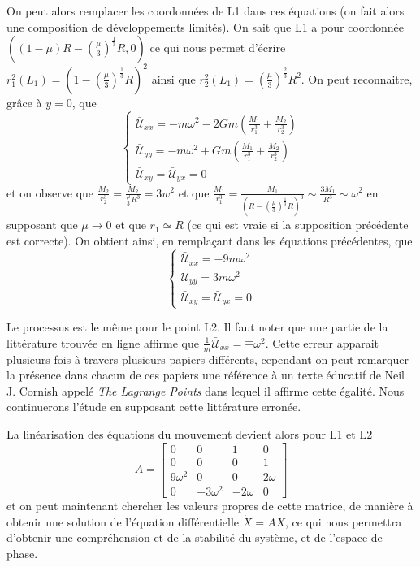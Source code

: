 \documentclass[12pt]{article}
\begin{document}
	On peut alors remplacer les coordonnées de L1 dans ces équations (on fait alors une composition de développements limités). On sait que L1 a pour coordonnée $((1-\mu)R-(\frac{\mu}{3})^\frac{1}{3}R, 0)$ ce qui nous permet d'écrire $r_1^2(L_1) = (1-(\frac{\mu}{3})^\frac{1}{3}R)^2$ ainsi que $r_2^2(L_1) = (\frac{\mu}{3})^\frac{2}{3}R^2$. On peut reconnaitre, grâce à $y=0$, que
	\begin{equation}
		 \begin{cases}
		 	\bar{\mathcal{U}}_{xx} = -m\omega^2 - 2Gm(\frac{M_1}{r_1^3} + \frac{M_2}{r_2^3})
		 	\\
		 	\bar{\mathcal{U}}_{yy} = -m\omega^2 + Gm(\frac{M_1}{r_1^3} + \frac{M_2}{r_2^3})
		 	\\
		 	\bar{\mathcal{U}}_{xy} = \bar{\mathcal{U}}_{yx} = 0
		 \end{cases}
	\end{equation}
	et on observe que $\frac{M_2}{r_2^3} = \frac{M_2}{\frac{\mu}{3}R^3} = 3w^2$ et que $\frac{M_1}{r_1^3} = \frac{M_1}{(R-(\frac{\mu}{3})^\frac{1}{3}R)^3} \sim \frac{3M_1}{R^3} \sim \omega^2$ en supposant que $\mu \to 0$ et que $r_1 \simeq R$ (ce qui est vraie si la supposition précédente est correcte). On obtient ainsi, en remplaçant dans les équations précédentes, que
	\begin{equation}
		\begin{cases}
		 	\bar{\mathcal{U}}_{xx} = -9m\omega^2
			\\
			\bar{\mathcal{U}}_{yy} = 3m\omega^2
			\\
			\bar{\mathcal{U}}_{xy} = \bar{\mathcal{U}}_{yx} = 0
		\end{cases}
	\end{equation}
	
	Le processus est le même pour le point L2. Il faut noter que une partie de la littérature trouvée en ligne affirme que $\frac{1}{m}\bar{\mathcal{U}}_{xx} = \mp \omega^2$. Cette erreur apparait plusieurs fois à travers plusieurs papiers différents, cependant on peut remarquer la présence dans chacun de ces papiers une référence à un texte éducatif de Neil J. Cornish appelé \textit{The Lagrange Points} dans lequel il affirme cette égalité. Nous continuerons l'étude en supposant cette littérature erronée.
	
	La linéarisation des équations du mouvement devient alors pour L1 et L2
	\begin{equation}
		A =
		\begin{bmatrix}
			0 & 0 & 1 & 0 \\
			0 & 0 & 0 & 1 \\
			9\omega^2 & 0
			& 0 & 2\omega \\
			0 & -3\omega^2
			& -2\omega & 0
		\end{bmatrix}
	\end{equation}
	et on peut maintenant chercher les valeurs propres de cette matrice, de manière à obtenir une solution de l'équation différentielle $\dot{X} = AX$, ce qui nous permettra d'obtenir une compréhension et de la stabilité du système, et de l'espace de phase.
	
\end{document}
